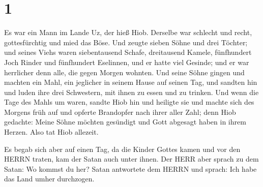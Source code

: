 \hypertarget{section}{%
\section{1}\label{section}}

 Es war ein Mann im Lande Uz, der hieß Hiob. Derselbe war
schlecht und recht, gottesfürchtig und mied das Böse.  Und
zeugte sieben Söhne und drei Töchter;  und seines Viehs
waren siebentausend Schafe, dreitausend Kamele, fünfhundert Joch Rinder
und fünfhundert Eselinnen, und er hatte viel Gesinde; und er war
herrlicher denn alle, die gegen Morgen wohnten.  Und seine
Söhne gingen und machten ein Mahl, ein jeglicher in seinem Hause auf
seinen Tag, und sandten hin und luden ihre drei Schwestern, mit ihnen zu
essen und zu trinken.  Und wenn die Tage des Mahls um waren,
sandte Hiob hin und heiligte sie und machte sich des Morgens früh auf
und opferte Brandopfer nach ihrer aller Zahl; denn Hiob gedachte: Meine
Söhne möchten gesündigt und Gott abgesagt haben in ihrem Herzen. Also
tat Hiob allezeit.

 Es begab sich aber auf einen Tag, da die Kinder Gottes
kamen und vor den HERRN traten, kam der Satan auch unter ihnen.
 Der HERR aber sprach zu dem Satan: Wo kommst du her? Satan
antwortete dem HERRN und sprach: Ich habe das Land umher durchzogen.


